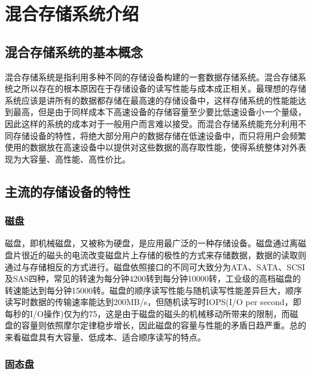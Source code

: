 
\chapter{混合存储系统介绍}
\label{chap:hss_intro}

\section{混合存储系统的基本概念}

混合存储系统是指利用多种不同的存储设备构建的一套数据存储系统。混合存储系统之所以存在的根本原因在于存储设备的读写性能与成本成正相关。最理想的存储系统应该是讲所有的数据都存储在最高速的存储设备中，这样存储系统的性能能达到最高，但是由于同样成本下高速设备的存储容量至少要比低速设备小一个量级，因此这样的系统的成本对于一般用户而言难以接受。而混合存储系统能充分利用不同存储设备的特性，将绝大部分用户的数据存储在低速设备中，而只将用户会频繁使用的数据放在高速设备中以提供对这些数据的高存取性能，使得系统整体对外表现为大容量、高性能、高性价比。

\section{主流的存储设备的特性}

\subsection{磁盘}

磁盘，即机械磁盘，又被称为硬盘，是应用最广泛的一种存储设备。磁盘通过离磁盘片很近的磁头的电流改变磁盘片上存储的极性的方式来存储数据，数据的读取则通过与存储相反的方式进行。磁盘依照接口的不同可大致分为ATA、SATA、SCSI及SAS四种，常见的转速为每分钟4200转到每分钟10000转，工业级的高档磁盘的转速能达到每分钟15000转。磁盘的顺序读写性能与随机读写性能差异巨大，顺序读写时数据的传输速率能达到200MB/s，但随机读写时IOPS(I/O per second，即每秒的I/O操作)仅为约75，这是由于磁盘的磁头的机械移动所带来的限制，而磁盘的容量则依照摩尔定律稳步增长，因此磁盘的容量与性能的矛盾日趋严重。总的来看磁盘具有大容量、低成本、适合顺序读写的特点。

\subsection{固态盘}

